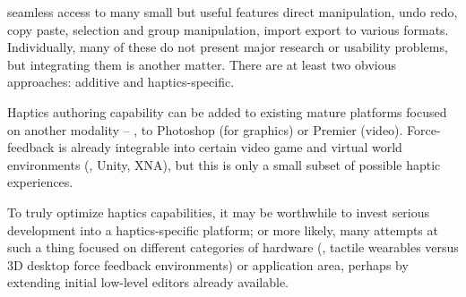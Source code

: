 %
%


%
%
 seamless access to many small but useful features
direct manipulation, undo  redo, copy  paste, selection and group manipulation,  import  export to various formats.
%
Individually, many of these do not present major research or usability problems, but integrating them is another matter.
There are at least two obvious approaches: additive and haptics-specific.

    Haptics authoring capability can be added to existing mature platforms focused on another modality -- \eg, to Photoshop (for graphics)  or Premier (video).
    Force-feedback is already integrable into certain video game and virtual world environments (\eg, Unity, XNA), but this is only a small subset of possible haptic experiences.

    To truly optimize haptics capabilities, it may be worthwhile to invest serious development into a haptics-specific platform; or more likely, many attempts at such a thing focused on different categories of hardware (\eg, tactile wearables versus 3D desktop force feedback environments) or application area, perhaps by extending initial low-level editors already available.

